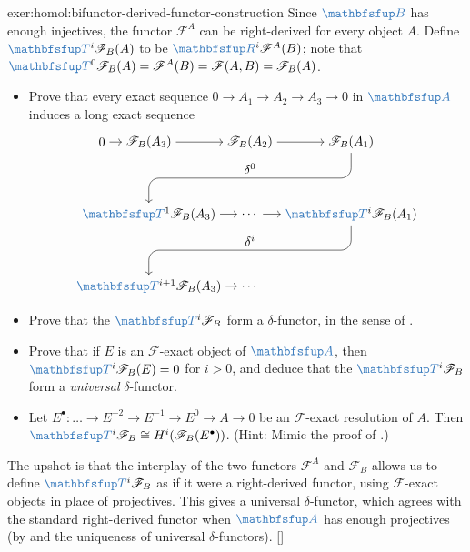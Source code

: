 \begin{exer}{\exerused{}}{exer:homol:bifunctor-derived-functor-construction}
  Since $\categ{B}$ has enough injectives, the functor $\mathscr{F}^A$
  can be right-derived for every object $A$. Define
  $\categ{T}^i\mathscr{F}_B(A)$ to be $\categ{R}^i\mathscr{F}^A(B)$;
  note that
  $\categ{T}^0\mathscr{F}_B(A) = \mathscr{F}^A(B) = \mathscr{F}(A, B)
  = \mathscr{F}_B(A)$.
  \begin{itemize}
  \item Prove that every exact sequence
    $0 \to A_1 \to A_2 \to A_3 \to 0$ in $\categ{A}$ induces a long
    exact sequence
    \[
      \begin{tikzpicture}[baseline=(current bounding box.center)]
        \node (zero) at (-1.3,2)
        {$0$}; \node (FA3) at (0,2)
        {$\mathscr{F}_B(A_3)$}; \node (FA2) at (2.8,2)
        {$\mathscr{F}_B(A_2)$}; \node (FA1) at (5.6,2)
        {$\mathscr{F}_B(A_1)$}; \node (T1A3) at (0,0)
        {$\categ{T}^1\mathscr{F}_B(A_3)$}; \node (dots1) at (2.8,0)
        {$\dots$}; \node (TiA1) at (5.6,0)
        {$\categ{T}^i\mathscr{F}_B(A_1)$}; \node (Ti1A3) at (0,-2)
        {$\categ{T}^{i+1}\mathscr{F}_B(A_3)$}; \node (dots2) at
        (2.8,-2)
        {$\dots$}; \draw[->] (zero) -- (FA3); \draw[->] (FA3) --
        (FA2); \draw[->] (FA2) -- (FA1); \draw[->] (T1A3) -- (dots1);
        \draw[->] (dots1) -- (TiA1); \draw[->] (Ti1A3) -- (dots2);
        \draw[->, rounded corners=8pt] (FA1.south) -- (5.6,1) --
        node[above]
        {$\delta^0$} (0,1) -- (T1A3.north); \draw[->, rounded
        corners=8pt] (TiA1.south) -- (5.6,-1) -- node[above]
        {$\delta^i$} (0,-1) -- (Ti1A3.north);
      \end{tikzpicture}
    \]
  \item Prove that the $\categ{T}^i\mathscr{F}_B$ form a
    $\delta$-functor, in the sense of
    .
  \item Prove that if $E$ is an $\mathscr{F}$-exact object of
    $\categ{A}$, then $\categ{T}^i\mathscr{F}_B(E) = 0$ for $i > 0$,
    and deduce that the $\categ{T}^i\mathscr{F}_B$ form a
    \emph{universal} $\delta$-functor.
  \item Let
    $E^\bullet : \dots \to E^{-2} \to E^{-1} \to E^0 \to A \to 0$ be
    an $\mathscr{F}$-exact resolution of $A$. Then
    $\categ{T}^i\mathscr{F}_B \cong H^i(\mathscr{F}_B(E^\bullet))$.
    (Hint: Mimic the proof of .)
  \end{itemize}
  The upshot is that the interplay of the two functors $\mathscr{F}^A$
  and $\mathscr{F}_B$ allows us to define $\categ{T}^i\mathscr{F}_B$
  as if it were a right-derived functor, using $\mathscr{F}$-exact
  objects in place of projectives. This gives a universal
  $\delta$-functor, which agrees with the standard right-derived
  functor when $\categ{A}$ has enough projectives (by
  and the uniqueness of universal
  $\delta$-functors). []
\end{exer}

